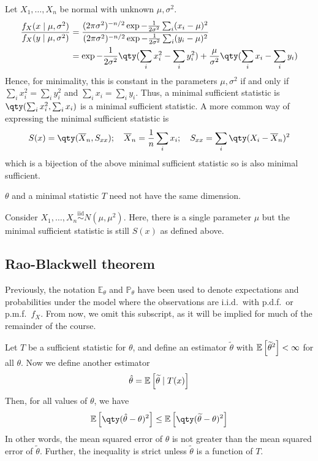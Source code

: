 \begin{example}
	Let $X_1, \dots, X_n$ be normal with unknown $\mu, \sigma^2$.
	\begin{align*}
		\frac{f_X(x \mid \mu, \sigma^2)}{f_X(y \mid \mu, \sigma^2)} & = \frac{(2 \pi \sigma^2)^{-n/2} \exp{-\frac{1}{2\sigma^2} \sum_i (x_i - \mu)^2}}{(2 \pi \sigma^2)^{-n/2} \exp{-\frac{1}{2\sigma^2} \sum_i (y_i - \mu)^2}} \\
		& = \exp{-\frac{1}{2\sigma^2} \qty(\sum_i x_i^2 - \sum_i y_i^2) + \frac{\mu}{\sigma^2} \qty(\sum_i x_i - \sum_i y_i)}
	\end{align*}
	Hence, for minimality, this is constant in the parameters $\mu, \sigma^2$ if and only if $\sum_i x_i^2 = \sum_i y_i^2$ and $\sum_i x_i = \sum_i y_i$.
	Thus, a minimal sufficient statistic is $\qty(\sum_i x_i^2, \sum_i x_i)$ is a minimal sufficient statistic.
	A more common way of expressing the minimal sufficient statistic is
	\begin{align*}
		S(x) = \qty(\overline X_n, S_{xx});\quad \overline X_n = \frac{1}{n} \sum_i x_i;\quad S_{xx} = \sum_i \qty(X_i - \overline X_n)^2
	\end{align*}
	which is a bijection of the above minimal sufficient statistic so is also minimal sufficient.
\end{example}

\begin{remark}
	$\theta$ and a minimal statistic $T$ need not have the same dimension.
\end{remark} 

\begin{example}
	Consider $X_1, \dots, X_n \overset{\text{iid}}{\sim} N(\mu, \mu^2)$. 
	Here, there is a single parameter $\mu$ but the minimal sufficient statistic is still $S(x)$ as defined above.
\end{example}

\subsection{Rao-Blackwell theorem}
Previously, the notation $\mathbb E_\theta$ and $\mathbb P_\theta$ have been used to denote expectations and probabilities under the model where the observations are i.i.d.\ with p.d.f.\ or p.m.f.\ $f_X$.
From now, we omit this subscript, as it will be implied for much of the remainder of the course.
\begin{theorem}
	Let $T$ be a sufficient statistic for $\theta$, and define an estimator $\widetilde \theta$ with $\mathbb{E}\left[{{\widetilde \theta}^2}\right] < \infty$ for all $\theta$.
	Now we define another estimator
	\begin{align*}
		\hat \theta = \mathbb{E}\left[{\widetilde \theta \mid T(x)}\right]
	\end{align*}
	Then, for all values of $\theta$, we have
	\begin{align*}
		\expect{\qty(\hat \theta - \theta)^2} \leq \expect{\qty(\widetilde \theta - \theta)^2}
	\end{align*}
	In other words, the mean squared error of $\hat \theta$ is not greater than the mean squared error of $\widetilde \theta$.
	Further, the inequality is strict unless $\widetilde \theta$ is a function of $T$.
\end{theorem}

